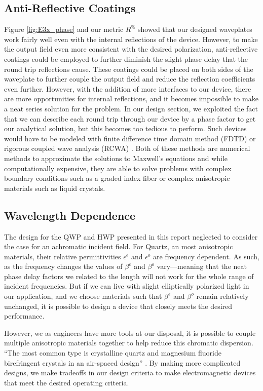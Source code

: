 \documentclass{optica-article}
\begin{document}
\subsection{Anti-Reflective Coatings}
Figure \ref{fig:E3x_phase} and our metric $R^\%$ showed that our designed 
waveplates work fairly well even with the internal reflections of the device.
However, to make the output field even more consistent with the desired 
polarization, anti-reflective coatings could be employed to further diminish 
the slight phase delay that the round trip reflections cause. These coatings 
could be placed on both sides of the waveplate to further couple the output
field and reduce the reflection coefficients even further. However, with the
addition of more interfaces to our device, there are more opportunities for
internal reflections, and it becomes impossible to make a neat series solution
for the problem. In our design section, we exploited the fact that we can 
describe each round trip through our device by a phase factor to get our 
analytical solution, but this becomes too tedious to perform. Such devices 
would have to be modeled with finite difference time domain method (FDTD) or 
rigorous coupled wave analysis (RCWA) \cite{FTDT,SLM_RCWA}. Both of these 
methods are numerical methods to approximate the solutions to Maxwell's 
equations and while computationally expensive, they are able to solve problems
with complex boundary conditions such as a graded index fiber or complex 
anisotropic materials such as liquid crystals.

\subsection{Wavelength Dependence}
The design for the QWP and HWP presented in this report neglected to consider
the case for an achromatic incident field. For Quartz, an most anisotropic
materials, their relative permittivities $\epsilon^e$ and $\epsilon^o$ are 
frequency dependent. As such, as the frequency changes the values of
$\beta^e$ and $\beta^o$ vary---meaning that the neat phase delay factors we 
related to the length will not work for the whole range of incident frequencies.
But if we can live with slight elliptically polarized light in our application,
and we choose materials such that $\beta^e$ and $\beta^o$ remain relatively
unchanged, it is possible to design a device that closely meets the desired 
performance.

However, we as engineers have more tools at our disposal, it is possible to 
couple multiple anisotropic materials together to help reduce this chromatic
dispersion. ``The most common type is crystalline quartz and magnesium fluoride 
birefringent crystals in an air-spaced design'' \cite{newport}. By making more
complicated designs, we make tradeoffs in our design criteria to make 
electromagnetic devices that meet the desired operating criteria.
\end{document}
